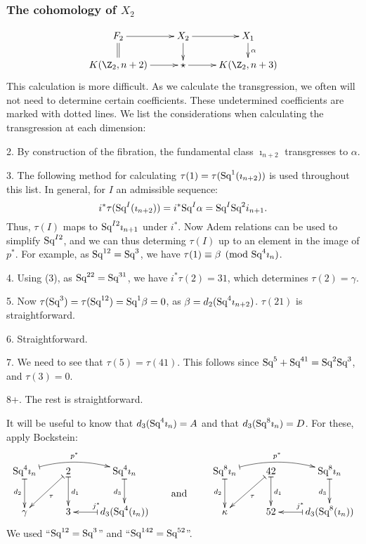 \documentclass[11pt]{article}
\begin{document}
\subsubsection{\texorpdfstring{The cohomology of $X_2$}{The cohomology of X2}}
\[\xymatrix@R=5mm{
F_2\ar[r]\ar@{=}[d]&
X_2\ar[d]\ar[r]&
X_{1}\ar[d]^{\alpha}\\
K(\Z_2,n+2)\ar[r]&\star\ar[r]&K(\Z_2,n+3)
}\]
This calculation is more difficult. As we calculate the transgression, we often
will not need to determine certain coefficients. These undetermined coefficients
are marked with dotted lines. We list the considerations when calculating the
transgression at each dimension:
\begin{itemise}
\item[2.]By construction of the fibration, the fundamental class
$\imath_{n+2}$ transgresses to $\alpha$.
\item[3.] The following method for calculating $\tau(1)=\tau(\textup{Sq}^1(\imath_{n+2}))$
 is used throughout this list. In general, for $I$ an admissible sequence:
\[i^*\tau(\textup{Sq}^I(\imath_{n+2}))=i^*\textup{Sq}^I\alpha=\textup{Sq}^I\textup{Sq}^2i_{n+1}.\]
Thus, $\tau(I)$ maps to $\textup{Sq}^{I2}\imath_{n+1}$ under $i^*$. Now Adem relations
can be used to simplify $\textup{Sq}^{I2}$, and we can thus determing $\tau(I)$ up to
an element in the image of $p^*$. For example, as $\textup{Sq}^{12}=\textup{Sq}^3$, we have
$\tau(1)\equiv\beta\pmod{\textup{Sq}^4\imath_n}$.
\item[4.] Using (3), as $\textup{Sq}^{22}=\textup{Sq}^{31}$, we have $i^*\tau(2)=31$,
which determines $\tau(2)=\gamma$.
\item[5.] Now $\tau(\textup{Sq}^3)=\tau(\textup{Sq}^{12})=\textup{Sq}^1\beta=0$, as 
$\beta=d_2(\textup{Sq}^4\imath_{n+2})$. $\tau(21)$ is straightforward.
\item[6.] Straightforward.
\item[7.] We need to see that $\tau(5)=\tau(41)$. This follows since
$\textup{Sq}^5+\textup{Sq}^{41}=\textup{Sq}^2\textup{Sq}^3$, and $\tau(3)=0$.
\item[8+.] The rest is straightforward.
\end{itemise}
It will be useful to know that $d_3(\textup{Sq}^4\imath_n)=A$ and that
$d_3(\textup{Sq}^8\imath_n)=D$. For these, apply Bockstein:
\[\xymatrix{
\Squ^4\imath_n\ar@{|->}[d]_{d_2}\ar@{|->}@/^.81pc/[rr]^{p^*}&
2\ar@{|->}[ld]^\tau\ar@{|->}[d]^{d_1}&
\Squ^4\imath_n\ar@{|->}[d]_{d_{3}}\\
\gamma&
3&d_3(\Squ^4(\imath_n))\ar@{|->}[l]_{j^*}
}
\raisebox{-.8cm}{\qquad and\qquad\ }
\xymatrix{
\Squ^8\imath_n\ar@{|->}[d]_{d_2}\ar@{|->}@/^.81pc/[rr]^{p^*}&
42\ar@{|->}[ld]^\tau\ar@{|->}[d]^{d_1}&
\Squ^8\imath_n\ar@{|->}[d]_{d_{3}}\\
\kappa&
52&d_3(\Squ^8(\imath_n))\ar@{|->}[l]_{j^*}
}
\]
We used ``$\textup{Sq}^{12}=\textup{Sq}^{3}$'' and
``$\textup{Sq}^{142}=\textup{Sq}^{52}$''.
\end{document}
